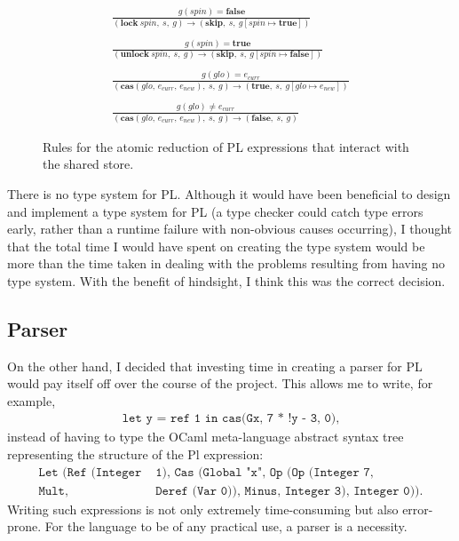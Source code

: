 \documentclass[12pt,a4paper,twoside,openright]{report}
\begin{document}
\begin{figure}
	\begin{gather*}
		\frac{g(\textit{spin}) = \textbf{false}}
		{(\textbf{lock}\ \textit{spin},\ s,\ g)
			\longrightarrow (\textbf{skip},\ s,\
			g[\textit{spin} \mapsto \textbf{true}])} \\
		\\
		\frac{g(\textit{spin}) = \textbf{true}}
			{(\textbf{unlock}\ \textit{spin},\ s,\ g)
				\longrightarrow (\textbf{skip},\ s,\
				g[\textit{spin} \mapsto \textbf{false}])} \\
		\\
		\frac{g(\textit{glo}) = e_\textit{curr}}
			 {(\textbf{cas}(\textit{glo},\, e_\textit{curr},\, e_\textit{new})
			 	,\ s,\ g) \longrightarrow (\textbf{true},\ s,
			 	\ g[\textit{glo} \mapsto e_\textit{new}])} \\
		\\
		\frac{g(\textit{glo}) \neq e_\textit{curr}}
			{(\textbf{cas}(\textit{glo},\, e_\textit{curr},\, e_\textit{new})
				,\ s,\ g) \longrightarrow
				(\textbf{false},\ s,\ g)} 
	\end{gather*}
	\caption{Rules for the atomic reduction of PL
		expressions that interact with the shared store.}
	\label{fig:pl-rules}
\end{figure}

There is no type system for PL. Although it would have been
beneficial to design and implement a type system for PL
(a type checker could catch type errors early, rather than a runtime
failure with non-obvious causes occurring), I thought that the total
time I would have spent on creating the type system would be more than
the time taken in dealing with the problems resulting from having
no type system. With the benefit of hindsight, I think this was the
correct decision.

\subsection{Parser}
On the other hand, I decided that investing time in creating a
parser for PL would pay itself off over the course of the project.
This allows me to write, for example,
\begin{align*}
	\texttt{let y = ref 1 in cas(Gx, 7 * !y - 3, 0)},
\end{align*}
instead of having to type the OCaml meta-language abstract
syntax tree representing the structure of the Pl expression:
\begin{align*}
	\texttt{Let (Ref (Integer}& \texttt{ 1), Cas (Global "x",
		Op (Op (Integer 7,} \\ \texttt{Mult,}& \texttt{ Deref (Var 0)), Minus, Integer 3),
		Integer 0))}.
\end{align*}
Writing such expressions is not only extremely time-consuming but
also error-prone. For the language to be of any practical use,
a parser is a necessity.
\end{document}
